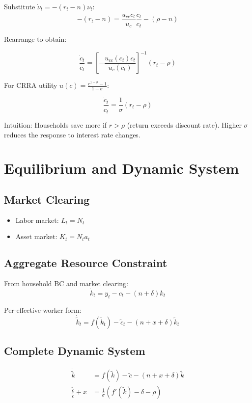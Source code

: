 \documentclass[a4paper,11pt]{article}
\newcommand{\ktilde}{\tilde{k}}
\newcommand{\ctilde}{\tilde{c}}
\begin{document}
Substitute $\dot{\nu}_t = -(r_t - n)\nu_t$:
\[
-(r_t - n) = \frac{u_{cc} c_t}{u_c} \frac{\dot{c}_t}{c_t} - (\rho - n)
\]

Rearrange to obtain:

\begin{resultbox}
\[
\frac{\dot{c}_t}{c_t} = \left[ -\frac{u_{cc}(c_t) c_t}{u_c(c_t)} \right]^{-1} (r_t - \rho)
\tag{Euler Equation (General)}
\]
\end{resultbox}

For CRRA utility $u(c) = \frac{c^{1-\sigma} - 1}{1-\sigma}$:

\begin{resultbox}
\[
\boxed{\frac{\dot{c}_t}{c_t} = \frac{1}{\sigma}(r_t - \rho)}
\tag{Euler Equation (CRRA)}
\]
\end{resultbox}

Intuition: Households save more if $r > \rho$ (return exceeds discount rate). Higher $\sigma$ reduces the response to interest rate changes.

\clearpage

\section*{Equilibrium and Dynamic System}

\subsection*{Market Clearing}
\begin{itemize}
    \item Labor market: $L_t = N_t$
    \item Asset market: $K_t = N_t a_t$
\end{itemize}

\subsection*{Aggregate Resource Constraint}
From household BC and market clearing:
\[
\dot{k}_t = y_t - c_t - (n + \delta)k_t
\tag{Per worker}
\]

Per-effective-worker form:
\[
\dot{\ktilde}_t = f(\ktilde_t) - \ctilde_t - (n + x + \delta)\ktilde_t
\tag{Per effective}
\]

\subsection*{Complete Dynamic System}
\[
\begin{aligned}
\dot{\ktilde} &= f(\ktilde) - \ctilde - (n + x + \delta)\ktilde \\
\frac{\dot{\ctilde}}{\ctilde} + x &= \frac{1}{\sigma}(f'(\ktilde) - \delta - \rho)
\end{aligned}
\]
\end{document}
